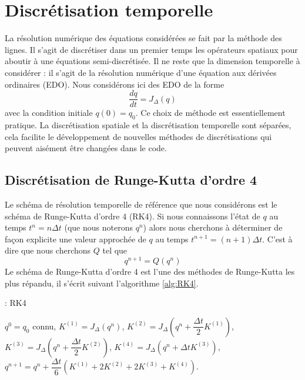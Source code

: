 \section{Discrétisation temporelle}

La résolution numérique des équations considérées se fait par la méthode des lignes. Il s'agit de discrétiser dans un premier temps les opérateurs spatiaux pour aboutir à une équations semi-discrétisée. Il ne reste que la dimension temporelle à considérer : il s'agit de la résolution numérique d'une équation aux dérivées ordinaires (EDO). Nous considérons ici des EDO de la forme
\begin{equation}
\dfrac{d q}{dt} = J_{\Delta} (q)
\label{eq:edo}
\end{equation}
avec la condition initiale $q(0)=q_0$. 
Ce choix de méthode est essentiellement pratique. La discrétisation spatiale et la discrétisation temporelle sont séparées, cela facilite le développement de nouvelles méthodes de discrétisations qui peuvent aisément être changées dans le code.

\subsection{Discrétisation de Runge-Kutta d'ordre 4}

Le schéma de résolution temporelle de référence que nous considérons est le schéma de Runge-Kutta d'ordre 4 (RK4). Si nous connaissons l'état de $q$ au temps $t^n = n \Delta t$ (que nous noterons $q^n$) alors nous cherchons à déterminer de façon explicite une valeur approchée de $q$ au temps $t^{n+1} = (n+1) \Delta t$. C'est à dire que nous cherchons $Q$ tel que
\begin{equation}
q^{n+1} = Q(q^n)
\end{equation}
Le schéma de Runge-Kutta d'ordre 4 est l'une des méthodes de Runge-Kutta les plus répandu, il s'écrit suivant l'algorithme \ref{alg:RK4}.

\begin{center}
\begin{minipage}[H]{12cm}
  \begin{algorithm}[H]
    \caption{: RK4}\label{alg:RK4}
    \begin{algorithmic}[1]
    \State $q^0 = q_0$ connu,
             \State  $K^{(1)} = J_{\Delta} \left( q^n \right)$,
             \State  $K^{(2)} = J_{\Delta} \left( q^n + \dfrac{\Delta t}{2} K^{(1)}\right)$,
             \State  $K^{(3)} = J_{\Delta} \left( q^n + \dfrac{\Delta t}{2} K^{(2)}\right)$,
             \State  $K^{(4)} = J_{\Delta} \left( q^n + \Delta t K^{(3)}\right)$,  
             \State  $q^{n+1} = q^n  + \dfrac{\Delta t}{6} \left( K^{(1)} + 2 K^{(2)} + 2 K^{(3)} + K^{(4)} \right)$.
            \EndFor
    \end{algorithmic}
    \end{algorithm}
\end{minipage}
\end{center}

